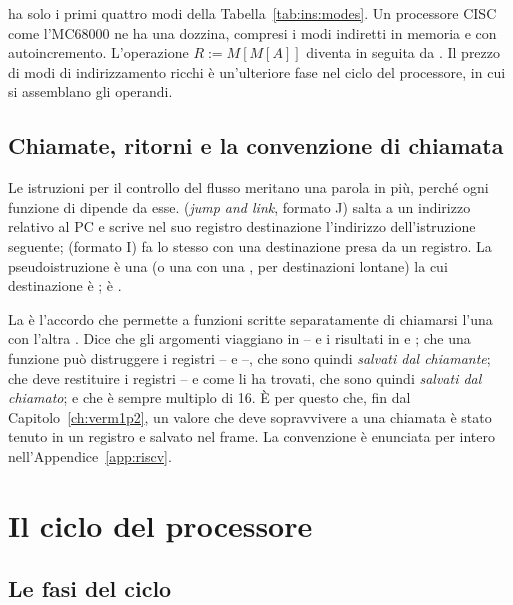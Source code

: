 \riscv ha solo i primi quattro modi della Tabella~\ref{tab:ins:modes}. Un
processore CISC come l'MC68000 ne ha una dozzina, compresi i modi indiretti in
memoria e con autoincremento. L'operazione $R:=M[M[A]]$ diventa in \riscv
{} seguita da . Il prezzo di modi di
indirizzamento ricchi è un'ulteriore fase nel ciclo del processore, in cui si
assemblano gli operandi.

\subsection{Chiamate, ritorni e la convenzione di chiamata}

Le istruzioni per il controllo del flusso meritano una parola in più, perché
ogni funzione di \vermone dipende da esse.  (\emph{jump and link},
formato J) salta a un indirizzo relativo al PC e scrive nel suo registro
destinazione l'indirizzo dell'istruzione seguente;  (formato I) fa
lo stesso con una destinazione presa da un registro. La pseudoistruzione
 è una  (o una  con una , per
destinazioni lontane) la cui destinazione è ;  è
.

La  è l'accordo che permette a funzioni scritte
separatamente di chiamarsi l'una con l'altra \citep{riscvabi}. Dice che gli
argomenti viaggiano in -- e i risultati in  e
; che una funzione può distruggere i registri -- e
--, che sono quindi \emph{salvati dal chiamante}; che deve
restituire i registri -- e  come li ha trovati, che
sono quindi \emph{salvati dal chiamato}; e che  è sempre multiplo di
16. È per questo che, fin dal Capitolo~\ref{ch:verm1p2}, un valore che deve
sopravvivere a una chiamata è stato tenuto in un registro  e salvato
nel frame. La convenzione è enunciata per intero
nell'Appendice~\ref{app:riscv}.

\section{Il ciclo del processore}

\subsection{Le fasi del ciclo}

